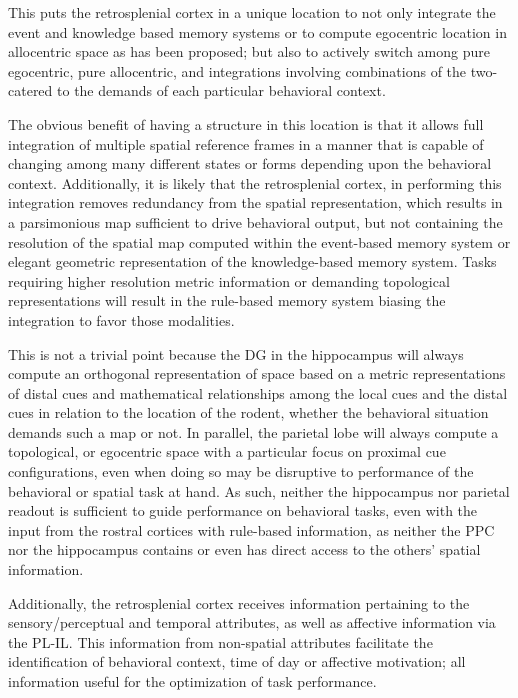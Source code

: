 \documentclass[doc, longtable]{apa6}
\begin{document}
This puts the retrosplenial cortex in a unique location to not only integrate the event and knowledge based memory systems or to compute egocentric location in allocentric space as has been proposed; but also to actively switch among pure egocentric, pure allocentric, and integrations involving combinations of the two-catered to the demands of each particular behavioral context.

The obvious benefit of having a structure in this location is that it allows full integration of multiple spatial reference frames in a manner that is capable of changing among many different states or forms depending upon the behavioral context. Additionally, it is likely that the retrosplenial cortex, in performing this integration removes redundancy from the spatial representation, which results in a parsimonious map sufficient to drive behavioral output, but not containing the resolution of the spatial map computed within the event-based memory system or elegant geometric representation of the knowledge-based memory system. Tasks requiring higher resolution metric information or demanding topological representations will result in the rule-based memory system biasing the integration to favor those modalities.

This is not a trivial point because the DG in the hippocampus will always compute an orthogonal representation of space based on a metric representations of distal cues and mathematical relationships among the local cues and the distal cues in relation to the location of the rodent, whether the behavioral situation demands such a map or not. In parallel, the parietal lobe will always compute a topological, or egocentric space with a particular focus on proximal cue configurations, even when doing so may be disruptive to performance of the behavioral or spatial task at hand. As such, neither the hippocampus nor parietal readout is sufficient to guide performance on behavioral tasks, even with the input from the rostral cortices with rule-based information, as neither the PPC nor the hippocampus contains or even has direct access to the others' spatial information.

Additionally, the retrosplenial cortex receives information pertaining to the sensory/perceptual and temporal attributes, as well as affective information via the PL-IL. This information from non-spatial attributes facilitate the identification of behavioral context, time of day or affective motivation; all information useful for the optimization of task performance.
\end{document}
